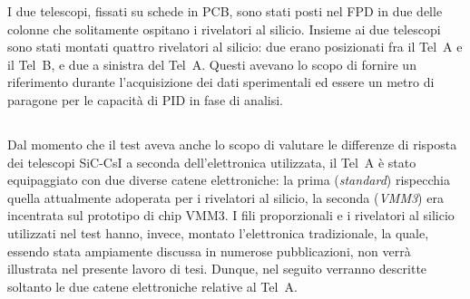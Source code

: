 I due telescopi, fissati su schede in PCB, sono stati posti nel FPD in due delle colonne che solitamente ospitano i rivelatori al silicio.
Insieme ai due telescopi sono stati montati quattro rivelatori al silicio: due erano posizionati fra il Tel~A e il Tel~B, e due a sinistra del Tel~A.
Questi avevano lo scopo di fornire un riferimento durante l'acquisizione dei dati sperimentali ed essere un metro di paragone per le capacità di PID in fase di analisi.









\subsection{}


Dal momento che il test aveva anche lo scopo di valutare le differenze di risposta dei telescopi SiC-CsI a seconda dell'elettronica utilizzata, il Tel~A è stato equipaggiato con due diverse catene elettroniche:
la prima (\emph{standard}) rispecchia quella attualmente adoperata per i rivelatori al silicio, la seconda (\emph{VMM3}) era incentrata sul prototipo di chip VMM3.
I fili proporzionali e i rivelatori al silicio utilizzati nel test hanno, invece, montato l'elettronica tradizionale, la quale, essendo stata ampiamente discussa in numerose pubblicazioni, non verrà illustrata nel presente lavoro di tesi.
Dunque, nel seguito verranno descritte soltanto le due catene elettroniche relative al Tel~A.


